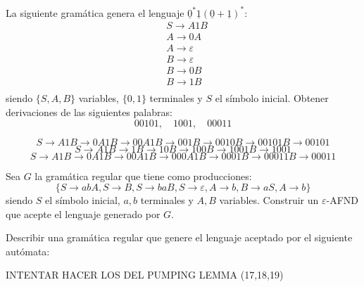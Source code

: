 \documentclass[twoside]{article}
\begin{document}
\begin{ejercicio}{14}
La siguiente gramática genera el lenguaje $\underline{0}^*\underline{1}(\underline{0} + \underline{1})^*$:
\begin{align*}
&S \rightarrow A1B\\
&A \rightarrow 0A\\
&A \rightarrow \varepsilon\\
&B \rightarrow \varepsilon\\
&B \rightarrow 0B\\
&B \rightarrow 1B\\
\end{align*}
siendo $\{S, A,B\}$ variables, $\{0, 1\}$ terminales y $S$ el símbolo inicial. Obtener derivaciones de las siguientes
palabras:
$$00101,\quad 1001,\quad 00011$$
\end{ejercicio}
\begin{solucion}
$$
S \rightarrow A1B \rightarrow 0A1B \rightarrow 00A1B \rightarrow 001B \rightarrow 0010B \rightarrow 00101B \rightarrow 00101
$$
$$
S \rightarrow A1B \rightarrow 1B\rightarrow 10B\rightarrow 100B\rightarrow 1001B\rightarrow 1001
$$
$$
S \rightarrow A1B \rightarrow 0A1B\rightarrow 00A1B\rightarrow 000A1B\rightarrow 0001B\rightarrow 00011B\rightarrow 00011
$$
\end{solucion}

\newpage

\begin{ejercicio}{15}
Sea $G$ la gramática regular que tiene como producciones:
$$\{S \rightarrow abA, S \rightarrow B, S \rightarrow baB, S \rightarrow \varepsilon, A \rightarrow b, B \rightarrow aS, A \rightarrow b\}$$
siendo $S$ el símbolo inicial, $a, b$ terminales y $A,B$ variables. Construir un $\varepsilon$-AFND que acepte el
lenguaje generado por $G$.
\end{ejercicio}
\begin{solucion}
\end{solucion}

\newpage

\begin{ejercicio}{16}
Describir una gramática regular que genere el lenguaje aceptado por el siguiente
autómata:
\end{ejercicio}
\begin{solucion}
\end{solucion}

INTENTAR HACER LOS DEL PUMPING LEMMA (17,18,19)
\end{document}
